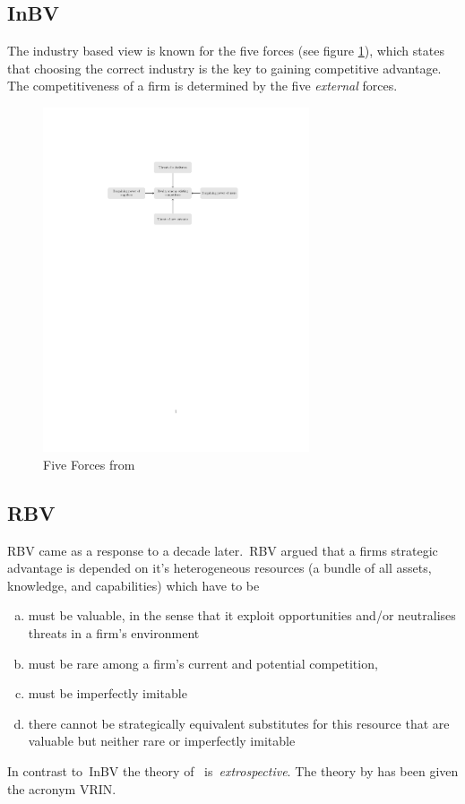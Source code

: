 \subsection{\gls{InBV}}
The industry based view is known for the five forces (see figure \ref{fig:5forces}), which states that choosing the correct industry is the key to gaining competitive advantage. The competitiveness of a firm is determined by the five \emph{external} forces.

\begin{figure}[htbp] 
	\centering
	\includegraphics[width=0.7\textwidth]{5forces}
 	\caption{Five Forces from \cite{Porter:1980}}
	\label{fig:5forces}
\end{figure}

\subsection{\glsdesc{RBV}}

\Gls{RBV} came as a response to \cite{Porter:1980} a decade later.~\Gls{RBV} argued that a firms strategic advantage is depended on it's heterogeneous resources (a bundle of all assets, knowledge, and capabilities) which have to be
\begin{enumerate}[(a)]
\item must be valuable, in the sense that it exploit opportunities and/or neutralises threats in a firm’s environment
\item must be rare among a firm’s current and potential competition, 
\item must be imperfectly imitable
\item  there cannot be strategically equivalent substitutes for this resource that are valuable but neither rare or imperfectly imitable 
\end{enumerate} 
In contrast to~\gls{InBV} the theory of~\cite{Barney:1991} is~\emph{extrospective}. 
The theory by \cite{Barney:1991}  has been given the acronym VRIN\@.\\

